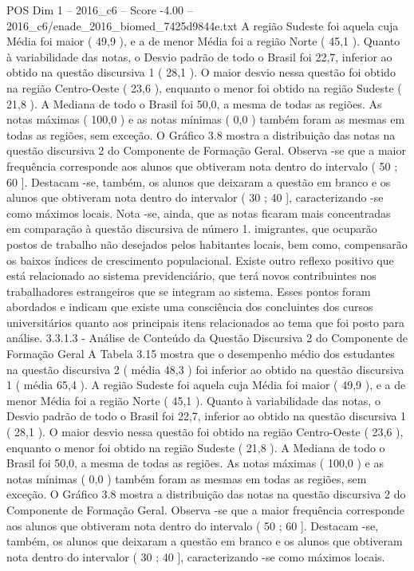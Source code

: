 \begin{textsample}{POS Dim 1 – 2016\_c6 – Score -4.00 – 2016\_c6/enade\_2016\_biomed\_7425d9844e.txt}
A região Sudeste foi aquela cuja Média foi maior ( 49,9 ), e a de menor Média foi a região Norte ( 45,1 ).
Quanto à variabilidade das notas, o Desvio padrão de todo o Brasil foi 22,7, inferior ao obtido na questão discursiva 1 ( 28,1 ).
O maior desvio nessa questão foi obtido na região Centro-Oeste ( 23,6 ), enquanto o menor foi obtido na região Sudeste ( 21,8 ).
A Mediana de todo o Brasil foi 50,0, a mesma de todas as regiões.
As notas máximas ( 100,0 ) e as notas mínimas ( 0,0 ) também foram as mesmas em todas as regiões, sem exceção.
O Gráfico 3.8 mostra a distribuição das notas na questão discursiva 2 do Componente de Formação Geral.
Observa -se que a maior frequência corresponde aos alunos que obtiveram nota dentro do intervalo ( 50 ; 60 ].
Destacam -se, também, os alunos que deixaram a questão em branco e os alunos que obtiveram nota dentro do intervalor ( 30 ; 40 ], caracterizando -se como máximos locais.
Nota -se, ainda, que as notas ficaram mais concentradas em comparação à questão discursiva de número 1. imigrantes, que ocuparão postos de trabalho não desejados pelos habitantes locais, bem como, compensarão os baixos índices de crescimento populacional.
Existe outro reflexo positivo que está relacionado ao sistema previdenciário, que terá novos contribuintes nos trabalhadores estrangeiros que se integram ao sistema.
Esses pontos foram abordados e indicam que existe uma consciência dos concluintes dos cursos universitários quanto aos principais itens relacionados ao tema que foi posto para análise. 3.3.1.3 - Análise de Conteúdo da Questão Discursiva 2 do Componente de Formação Geral A Tabela 3.15 mostra que o desempenho médio dos estudantes na questão discursiva 2 ( média 48,3 ) foi inferior ao obtido na questão discursiva 1 ( média 65,4 ).
A região Sudeste foi aquela cuja Média foi maior ( 49,9 ), e a de menor Média foi a região Norte ( 45,1 ).
Quanto à variabilidade das notas, o Desvio padrão de todo o Brasil foi 22,7, inferior ao obtido na questão discursiva 1 ( 28,1 ).
O maior desvio nessa questão foi obtido na região Centro-Oeste ( 23,6 ), enquanto o menor foi obtido na região Sudeste ( 21,8 ).
A Mediana de todo o Brasil foi 50,0, a mesma de todas as regiões.
As notas máximas ( 100,0 ) e as notas mínimas ( 0,0 ) também foram as mesmas em todas as regiões, sem exceção.
O Gráfico 3.8 mostra a distribuição das notas na questão discursiva 2 do Componente de Formação Geral.
Observa -se que a maior frequência corresponde aos alunos que obtiveram nota dentro do intervalo ( 50 ; 60 ].
Destacam -se, também, os alunos que deixaram a questão em branco e os alunos que obtiveram nota dentro do intervalor ( 30 ; 40 ], caracterizando -se como máximos locais.

\end{textsample}
